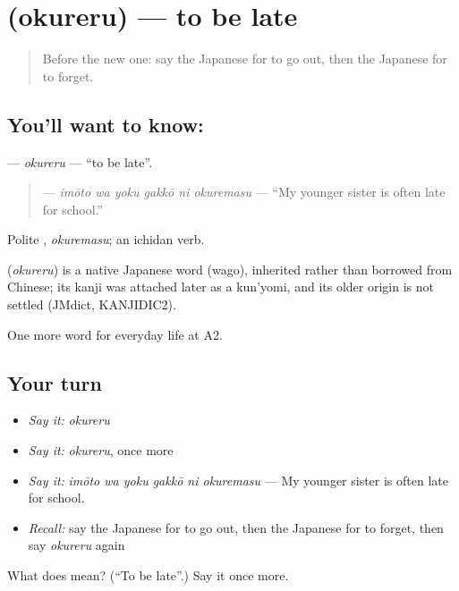\section[\texorpdfstring{\ja{おくれる} (okureru)}{おくれる (okureru)}]{ (okureru) — to be late}

\label{lesson:JA-C152-okureru}



\begin{quote}
Before the new one: say the Japanese for to go out, then the Japanese for to forget.
\end{quote}

\subsection*{You'll want to know: }
\textbf{} — \emph{okureru} — \textquotedblleft{}to be late\textquotedblright{}.

\begin{quote}
\textbf{   } — \emph{imōto wa yoku gakkō ni okuremasu} — \textquotedblleft{}My younger sister is often late for school.\textquotedblright{}
\end{quote}

Polite \textbf{}, \emph{okuremasu}; an ichidan verb.

\begin{cousinweb}
\textbf{} (\emph{okureru}) is a native Japanese word (wago), inherited rather than borrowed from Chinese; its kanji was attached later as a kun'yomi, and its older origin is not settled (JMdict, KANJIDIC2).
\end{cousinweb}

\begin{grammarlens}[title={What you've built}]
One more word for everyday life at A2.
\end{grammarlens}

\subsection*{Your turn}
\begin{itemize}
\raggedright
  \item \emph{Say it:} \emph{okureru}
  \item \emph{Say it:} \emph{okureru}, once more
  \item \emph{Say it:} \emph{imōto wa yoku gakkō ni okuremasu} — My younger sister is often late for school.
  \item \emph{Recall:} say the Japanese for to go out, then the Japanese for to forget, then say \emph{okureru} again
\end{itemize}

\begin{tcolorbox}[breakable,colback=teal!4,colframe=teal!35!black,title={Before you move on}]
What does  mean? (\textquotedblleft{}To be late\textquotedblright{}.) Say it once more.
\end{tcolorbox}
